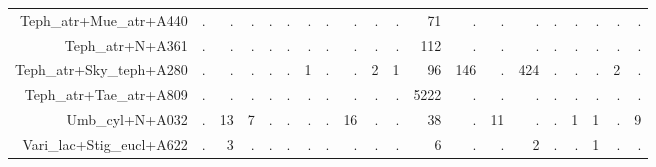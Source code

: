 \documentclass[a4paper, 11]{article}\usepackage[]{graphicx}\usepackage[]{color}
\begin{document}
\begin{table}
\begin{tabular}{rrrrrrrrrrrrrrrrrrrr}
  Teph\_atr+Mue\_atr+A440 & . & . & . & . & . & . & . & . & . & . & 71 & . & . & . & . & . & . & . & . \\ 
  Teph\_atr+N+A361 & . & . & . & . & . & . & . & . & . & . & 112 & . & . & . & . & . & . & . & . \\ 
  Teph\_atr+Sky\_teph+A280 & . & . & . & . & . & 1 & . & . & 2 & 1 & 96 & 146 & . & 424 & . & . & . & 2 & . \\ 
  Teph\_atr+Tae\_atr+A809 & . & . & . & . & . & . & . & . & . & . & 5222 & . & . & . & . & . & . & . & . \\ 
  Umb\_cyl+N+A032 & . & 13 & 7 & . & . & . & . & 16 & . & . & 38 & . & 11 & . & . & 1 & 1 & . & 9 \\ 
  Vari\_lac+Stig\_eucl+A622 & . & 3 & . & . & . & . & . & . & . & . & 6 & . & . & 2 & . & . & 1 & . & . \\ 
   \hline
\end{tabular}
\end{table}
\end{document}
